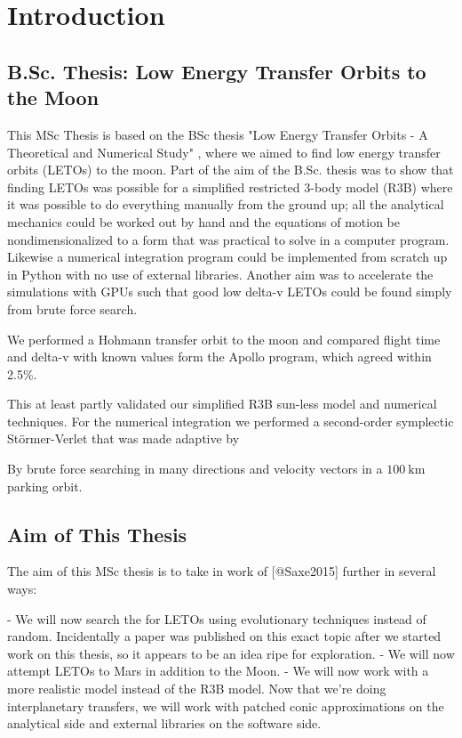 
\chapter{Introduction}

\section{B.Sc. Thesis: Low Energy Transfer Orbits to the Moon}

This MSc Thesis is based on the BSc thesis "Low Energy Transfer Orbits - A Theoretical and Numerical Study" \cite{Saxe2015}, where we aimed to find low energy transfer orbits (LETOs) to the moon. Part of the aim of the B.Sc. thesis was to show that finding LETOs was possible for a simplified restricted 3-body model (R3B) where it was possible to do everything manually from the ground up; all the analytical mechanics could be worked out by hand and the equations of motion be nondimensionalized to a form that was practical to solve in a computer program. Likewise a numerical integration program could be implemented from scratch up in Python with no use of external libraries. Another aim was to accelerate the simulations with GPUs such that good low delta-v LETOs could be found simply from brute force search.

We performed a Hohmann transfer orbit to the moon and compared flight time and delta-v with known values form the Apollo program, which agreed within 2.5\%.


This at least partly validated our simplified R3B sun-less model and numerical techniques. For the numerical integration we performed a second-order symplectic Störmer-Verlet that was made adaptive by 


By brute force searching in many directions and velocity vectors in a \(\SI{100}{\km}\) parking orbit.

\section{Aim of This Thesis}

The aim of this MSc thesis is to take in work of [@Saxe2015] further in several ways:

- We will now search the for LETOs using evolutionary techniques instead of random. Incidentally a paper \cite{Izzo2018} was published on this exact topic after we started work on this thesis, so it appears to be an idea ripe for exploration.
- We will now attempt LETOs to Mars in addition to the Moon.
- We will now work with a more realistic model instead of the R3B model. Now that we're doing interplanetary transfers, we will work with patched conic approximations on the analytical side and external libraries on the software side.
